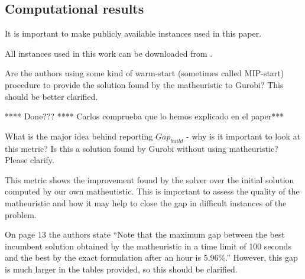 \documentclass{article}
\newenvironment{reviewer}{\setcounter{pointcounter}{1}}{}
\newcommand{\point}{\text{{\selectfont \thepointcounter} \stepcounter{pointcounter}}}
\newcommand{\JP}[1]{{\color{black}#1}}
\begin{document}
\begin{reviewer}
		
		\subsection*{Computational results}
		
		\begin{itshape}
			It is important to make publicly available instances used in this paper.
		\end{itshape}
		
		\begin{tcolorbox}[breakable,enhanced,coltitle=black,colback=green!5!white,colframe=green!75!black,title=\textbf{Answer R2.\point},borderline={1pt}{0pt}{black},boxrule=0pt]
			All instances used in this work can be downloaded from \cite{valverde2023}.
		\end{tcolorbox}
		
		\begin{itshape}
			Are the authors using some kind of warm-start (sometimes called MIP-start) procedure to provide the solution found by the matheuristic to Gurobi? This should be better clarified.
		\end{itshape}
		
		\begin{tcolorbox}[breakable,enhanced,coltitle=black,colback=green!5!white,colframe=green!75!black,title=\textbf{Answer R2.\point},borderline={1pt}{0pt}{black},boxrule=0pt]
			\JP{**** Done??? **** Carlos comprueba que lo hemos explicado en el paper***}
 		\end{tcolorbox}
		
		\begin{itshape}
			What is the major idea behind reporting $Gap_{build}$ - why is it important to look at this metric? Is this a solution found by Gurobi without using matheuristic? Please clarify.
		\end{itshape}

		\begin{tcolorbox}[breakable,enhanced,coltitle=black,colback=green!5!white,colframe=green!75!black,title=\textbf{Answer R2.\point},borderline={1pt}{0pt}{black},boxrule=0pt]
			\JP{This metric shows the improvement found by the solver over the initial solution computed by our own matheutistic. This is important to assess the quality of the matheuristic and how it may help to close the gap in difficult instances of the problem.}
		\end{tcolorbox}

		\begin{itshape}
			On page 13 the authors state ``Note that the maximum gap between the best incumbent solution obtained by the matheuristic in a time limit of 100 seconds and the best by the exact formulation after an hour is 5.96\%.'' However, this gap is much larger in the tables provided, so this should be clarified.
		\end{itshape}
  

\end{reviewer}
\end{document}
